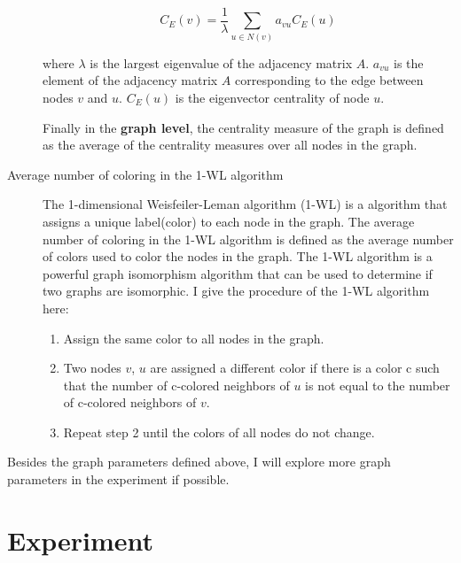 \documentclass{article}
\begin{document}
\begin{description}
    \[ C_E(v) = \frac{1}{\lambda} \sum_{u \in N(v)} a_{vu} C_E(u) \]
    
    where $ \lambda$ is the largest eigenvalue of the adjacency matrix $A$.
$a_{vu}$ is the element of the adjacency matrix $A$ corresponding to the edge between nodes $v$  and $u$.
$ C_E(u)$  is the eigenvector centrality of node $u$.


    Finally in the \textbf{graph level}, the centrality measure of the graph is defined as the average of the centrality measures over all nodes in the graph.
    \item [Average number of coloring in the 1-WL algorithm] The 1-dimensional Weisfeiler-Leman algorithm (1-WL) is a algorithm that assigns a unique label(color) to each node in the graph. The average number of coloring in the 1-WL algorithm is defined as the average number of colors used to color the nodes in the graph. The 1-WL algorithm is a powerful graph isomorphism algorithm that can be used to determine if two graphs are isomorphic. I give the procedure of the 1-WL algorithm here:
    \begin{enumerate}
        \item Assign the same color to all nodes in the graph.
        \item Two nodes $v$, $u$ are assigned a different color if there is a color c such that the number of c-colored neighbors of $u$ is not equal to the number of c-colored neighbors of $v$.
        \item Repeat step 2 until the colors of all nodes do not change.
    \end{enumerate}
    
\end{description}


Besides the graph parameters defined above, I will explore more graph parameters in the experiment if possible.

\section{Experiment}
\end{document}
